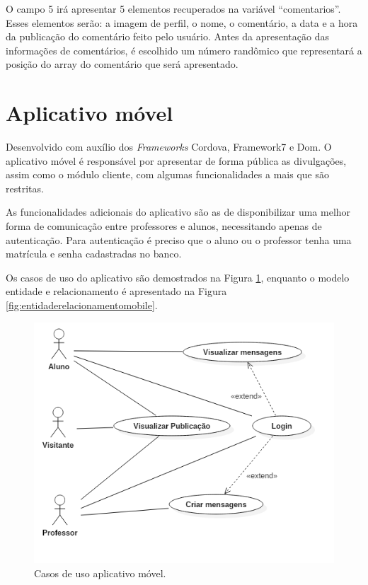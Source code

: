 O campo 5 irá apresentar 5 elementos recuperados na variável ``comentarios''. Esses elementos serão: a imagem de perfil, o nome, o comentário, a data e a hora da publicação do comentário feito pelo usuário. Antes da apresentação das informações de comentários, é escolhido um número randômico que representará a posição do array do comentário que será apresentado.

\section{Aplicativo móvel}
Desenvolvido com auxílio dos \textit{Frameworks} Cordova, Framework7 e Dom. O aplicativo móvel é responsável por apresentar de forma pública as divulgações, assim como o módulo cliente, com algumas funcionalidades a mais que são restritas.

As funcionalidades adicionais do aplicativo são as de disponibilizar uma melhor forma de comunicação entre professores e alunos, necessitando apenas de autenticação. Para autenticação é preciso que o aluno ou o professor tenha uma matrícula e senha cadastradas no banco.

Os casos de uso do aplicativo são demostrados na Figura \ref{fig:casosdeusomobile}, enquanto o modelo entidade e relacionamento é apresentado na Figura \ref{fig:entidaderelacionamentomobile}.
\begin{figure}[H]
\centering
\includegraphics[scale=0.4]{figuras/CasosDeUsoMobile}
\caption{Casos de uso aplicativo móvel.}
\label{fig:casosdeusomobile}
\end{figure}

